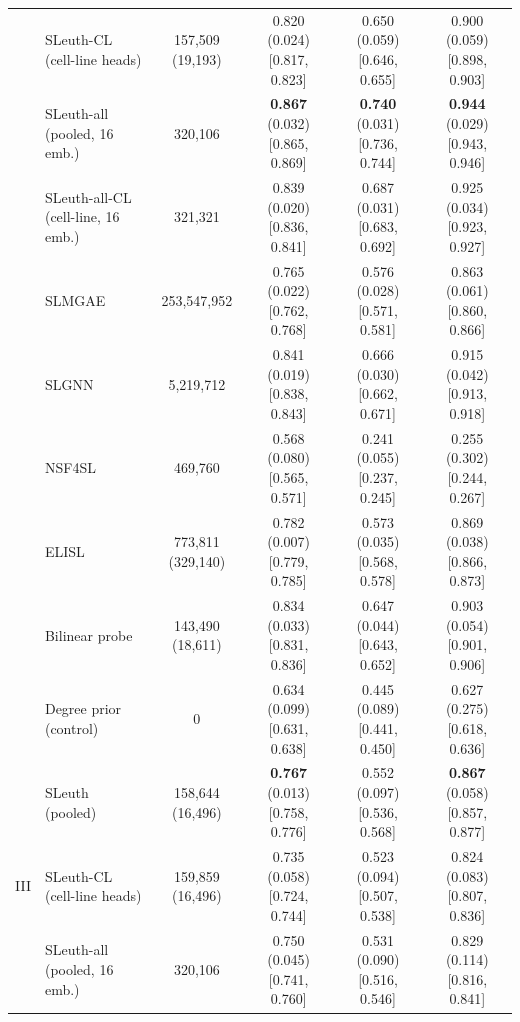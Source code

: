 \begin{tabular}{ll|cccc}
 & SLeuth-CL (cell-line heads) & 157{,}509 (19{,}193) & 0.820 (0.024) {\scriptsize [0.817, 0.823]} & 0.650 (0.059) {\scriptsize [0.646, 0.655]} & 0.900 (0.059) {\scriptsize [0.898, 0.903]} \\
 & SLeuth-all (pooled, 16 emb.) & 320{,}106 & \textbf{0.867} (0.032) {\scriptsize [0.865, 0.869]} & \textbf{0.740} (0.031) {\scriptsize [0.736, 0.744]} & \textbf{0.944} (0.029) {\scriptsize [0.943, 0.946]} \\
 & SLeuth-all-CL (cell-line, 16 emb.) & 321{,}321 & 0.839 (0.020) {\scriptsize [0.836, 0.841]} & 0.687 (0.031) {\scriptsize [0.683, 0.692]} & 0.925 (0.034) {\scriptsize [0.923, 0.927]} \\
 & SLMGAE & 253{,}547{,}952 & 0.765 (0.022) {\scriptsize [0.762, 0.768]} & 0.576 (0.028) {\scriptsize [0.571, 0.581]} & 0.863 (0.061) {\scriptsize [0.860, 0.866]} \\
 & SLGNN & 5{,}219{,}712 & 0.841 (0.019) {\scriptsize [0.838, 0.843]} & 0.666 (0.030) {\scriptsize [0.662, 0.671]} & 0.915 (0.042) {\scriptsize [0.913, 0.918]} \\
 & NSF4SL & 469{,}760 & 0.568 (0.080) {\scriptsize [0.565, 0.571]} & 0.241 (0.055) {\scriptsize [0.237, 0.245]} & 0.255 (0.302) {\scriptsize [0.244, 0.267]} \\
 & ELISL & 773{,}811 (329{,}140) & 0.782 (0.007) {\scriptsize [0.779, 0.785]} & 0.573 (0.035) {\scriptsize [0.568, 0.578]} & 0.869 (0.038) {\scriptsize [0.866, 0.873]} \\
 & Bilinear probe & 143{,}490 (18{,}611) & 0.834 (0.033) {\scriptsize [0.831, 0.836]} & 0.647 (0.044) {\scriptsize [0.643, 0.652]} & 0.903 (0.054) {\scriptsize [0.901, 0.906]} \\
 & Degree prior (control) & 0 & 0.634 (0.099) {\scriptsize [0.631, 0.638]} & 0.445 (0.089) {\scriptsize [0.441, 0.450]} & 0.627 (0.275) {\scriptsize [0.618, 0.636]} \\
\hline
\multirow{10}{*}{III} & SLeuth (pooled) & 158{,}644 (16{,}496) & \textbf{0.767} (0.013) {\scriptsize [0.758, 0.776]} & 0.552 (0.097) {\scriptsize [0.536, 0.568]} & \textbf{0.867} (0.058) {\scriptsize [0.857, 0.877]} \\
 & SLeuth-CL (cell-line heads) & 159{,}859 (16{,}496) & 0.735 (0.058) {\scriptsize [0.724, 0.744]} & 0.523 (0.094) {\scriptsize [0.507, 0.538]} & 0.824 (0.083) {\scriptsize [0.807, 0.836]} \\
 & SLeuth-all (pooled, 16 emb.) & 320{,}106 & 0.750 (0.045) {\scriptsize [0.741, 0.760]} & 0.531 (0.090) {\scriptsize [0.516, 0.546]} & 0.829 (0.114) {\scriptsize [0.816, 0.841]} \\

\end{tabular}
